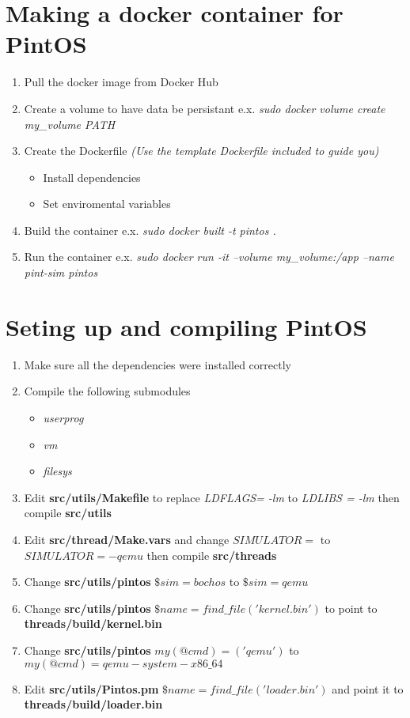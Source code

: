 \documentclass[12pt]{article}
\begin{document}
\maketitle

\section{Making a docker container for PintOS}

\begin{enumerate}
	\item Pull the docker image from Docker Hub
	\item Create a volume to have data be persistant e.x. \textit{sudo docker volume create my\_volume PATH}
	\item Create the Dockerfile \textit{(Use the template Dockerfile included to guide you)}
	\begin{itemize}
		\item Install dependencies 
		\item Set enviromental variables 
	\end{itemize}
	\item Build the container e.x. \textit{sudo docker built -t pintos .}
	\item Run the container e.x. \textit{sudo docker run -it --volume my\_volume:/app --name pint-sim pintos}
	
\end{enumerate}

\section{Seting up and compiling PintOS}
\begin{enumerate}
	\item Make sure all the dependencies were installed correctly
	\item Compile the following submodules
	\begin{itemize}
		\item \textit{userprog}
		\item \textit{vm}
		\item \textit{filesys}
	\end{itemize}
	\item Edit \textbf{src/utils/Makefile} to replace \textit{LDFLAGS= -lm} to \textit{LDLIBS = -lm} then compile \textbf{src/utils}
	\item Edit  \textbf{src/thread/Make.vars} and change $SIMULATOR=$ to $SIMULATOR= -qemu$ then compile \textbf{src/threads}
	\item Change \textbf{src/utils/pintos} $\$sim=bochos$ to $\$sim=qemu$
	\item Change \textbf{src/utils/pintos} $\$name = find\_file('kernel.bin')$ to point to  \textbf{threads/build/kernel.bin}
	\item  Change \textbf{src/utils/pintos} $my (@cmd) = ('qemu')$ to $my (@cmd) =qemu-system-x86\_64$
	\item Edit \textbf{src/utils/Pintos.pm} $\$name = find\_file('loader.bin')$ and point it to \textbf{threads/build/loader.bin}
\end{enumerate}
\end{document}
